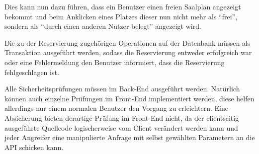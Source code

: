 Dies kann nun dazu führen, dass ein Benutzer einen freien Saalplan angezeigt bekommt und beim Anklicken eines Platzes dieser nun nicht mehr als \enquote{frei}, sondern als \enquote{durch einen anderen Nutzer belegt} angezeigt wird.

Die zu der Reservierung zugehörigen Operationen auf der Datenbank müssen als Transaktion ausgeführt werden, sodass die Reservierung entweder erfolgreich war oder eine Fehlermeldung den Benutzer informiert, dass die Reservierung fehlgeschlagen ist.

Alle Sicherheitsprüfungen müssen im Back-End ausgeführt werden.
Natürlich können auch einzelne Prüfungen im Front-End implementiert werden, diese helfen allerdings nur einem normalen Benutzer den Vorgang zu erleichtern.
Eine Absicherung bieten derartige Prüfung im Front-End nicht, da der clientseitig ausgeführte Quellcode logischerweise vom Client verändert werden kann und jeder Angreifer eine manipulierte Anfrage mit selbst gewählten Parametern an die \acs{API} schicken kann.